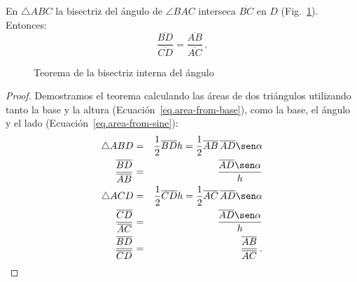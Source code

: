 \begin{theorem}\label{thm.angle-bisector}
En $\triangle ABC$ la bisectriz del ángulo de $\angle BAC$ interseca $\overline{BC}$ en $D$ (Fig.~\ref{f.angle-bisector}). Entonces:
\[
\frac {\overline{BD}}{\overline{CD}}=\frac {\overline{AB}}{\overline{AC}}\,.
\]
\end{theorem}

\begin{figure}[b]
\begin{center}
\end{center}
\caption{Teorema de la bisectriz interna del ángulo}\label{f.angle-bisector}
\end{figure}
\begin{proof}
Demostramos el teorema calculando las áreas de dos triángulos utilizando tanto la base y la altura (Ecuación~\ref{eq.area-from-base}), como la base, el ángulo y el lado (Ecuación~\ref{eq.area-from-sine}):
\begin{eqnarray*}
\triangle ABD&=&\frac{1}{2}\overline{BD}h=\frac{1}{2}\overline{AB}\,\overline{AD}\sen \alpha\\
\frac{\overline{BD}}{\overline{AB}}&=&\frac{\overline{AD}\sen \alpha}{h}\\
\triangle ACD&=&\frac{1}{2}\overline{CD}h=\frac{1}{2}\overline{AC}\,\overline{AD}\sen \alpha\\
\frac{\overline{CD}}{\overline{AC}}&=&\frac{\overline{AD}\sen \alpha}{h}\\
\frac{\overline{BD}}{\overline{CD}}&=&\frac{\overline{AB}}{\overline{AC}}\,.
\end{eqnarray*}
\end{proof}

